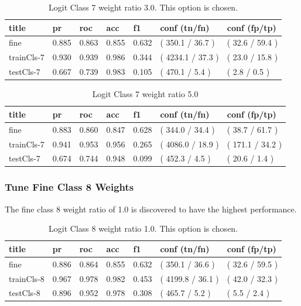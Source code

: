 \documentclass[ms]{nuthesis}
\begin{document}
\FloatBarrier
\begin{table}[H]
\centering
\caption{Logit Class 7 weight ratio 3.0. This option is chosen.}
\label{tab:LogRegCls7-Wt3}
\begin{tabular}{|l||l||l||l||l||l||l|}\toprule
title & pr & roc & acc & f1 & conf (tn/fn) & conf (fp/tp) \\ \midrule
fine & 0.885 & 0.863 & 0.855 & 0.632 & ( 350.1 / 36.7 ) & ( 32.6 / 59.4 ) \\
trainCls-7 & 0.930 & 0.939 & 0.986 & 0.344 & ( 4234.1 / 37.3 ) & ( 23.0 / 15.8 ) \\
testCls-7 & 0.667 & 0.739 & 0.983 & 0.105 & ( 470.1 / 5.4 ) & ( 2.8 / 0.5 ) \\ \bottomrule
\end{tabular}
\end{table}
\FloatBarrier

\FloatBarrier
\begin{table}[H]
\centering
\caption{Logit Class 7 weight ratio 5.0}
\label{tab:LogRegCls7-Wt5}
\begin{tabular}{|l||l||l||l||l||l||l|}\toprule
title & pr & roc & acc & f1 & conf (tn/fn) & conf (fp/tp) \\ \midrule
fine & 0.883 & 0.860 & 0.847 & 0.628 & ( 344.0 / 34.4 ) & ( 38.7 / 61.7 ) \\
trainCls-7 & 0.941 & 0.953 & 0.956 & 0.265 & ( 4086.0 / 18.9 ) & ( 171.1 / 34.2 ) \\
testCls-7 & 0.674 & 0.744 & 0.948 & 0.099 & ( 452.3 / 4.5 ) & ( 20.6 / 1.4 ) \\ \bottomrule
\end{tabular}
\end{table}
\FloatBarrier

\subsubsection{Tune Fine Class 8 Weights}
\par The fine class 8 weight ratio of 1.0 is discovered to have the highest performance.
\FloatBarrier
\begin{table}[H]
\centering
\caption{Logit Class 8 weight ratio 1.0. This option is chosen.}
\label{tab:LogRegCls8-Wt1}
\begin{tabular}{|l||l||l||l||l||l||l|}\toprule
title & pr & roc & acc & f1 & conf (tn/fn) & conf (fp/tp) \\ \midrule
fine & 0.886 & 0.864 & 0.855 & 0.632 & ( 350.1 / 36.6 ) & ( 32.6 / 59.5 ) \\
trainCls-8 & 0.967 & 0.978 & 0.982 & 0.453 & ( 4199.8 / 36.1 ) & ( 42.0 / 32.3 ) \\
testCls-8 & 0.896 & 0.952 & 0.978 & 0.308 & ( 465.7 / 5.2 ) & ( 5.5 / 2.4 ) \\ \bottomrule
\end{tabular}
\end{table}
\FloatBarrier
\end{document}
